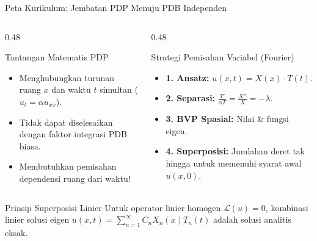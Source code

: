 \documentclass[aspectratio=169,10pt]{beamer}
\begin{document}
\begin{frame}{Peta Kurikulum: Jembatan PDP Menuju PDB Independen}
  \begin{columns}[t]
    \begin{column}{0.48\textwidth}
      \begin{block}{Tantangan Matematis PDP}
        \small
        \begin{itemize}
          \item Menghubungkan turunan ruang $x$ dan waktu $t$ simultan ($u_t = \alpha u_{xx}$).
          \item Tidak dapat diselesaikan dengan faktor integrasi PDB biasa.
          \item Membutuhkan pemisahan dependensi ruang dari waktu!
        \end{itemize}
      \end{block}
    \end{column}
    \begin{column}{0.48\textwidth}
      \begin{alertblock}{Strategi Pemisahan Variabel (Fourier)}
        \small
        \begin{itemize}
          \item \textbf{1. Ansatz:} $u(x,t) = X(x) \cdot T(t)$.
          \item \textbf{2. Separasi:} $\frac{T'}{\alpha T} = \frac{X''}{X} = -\lambda$.
          \item \textbf{3. BVP Spasial:} Nilai \& fungsi eigen.
          \item \textbf{4. Superposisi:} Jumlahan deret tak hingga untuk memenuhi syarat awal $u(x,0)$.
        \end{itemize}
      \end{alertblock}
    \end{column}
  \end{columns}
  \vspace{0.05cm}
  \begin{exampleblock}{Prinsip Superposisi Linier}
    \small
    Untuk operator linier homogen $\mathcal{L}(u) = 0$, kombinasi linier solusi eigen $u(x,t) = \sum_{n=1}^\infty C_n X_n(x) T_n(t)$ adalah solusi analitis eksak.
  \end{exampleblock}
\end{frame}
\end{document}
